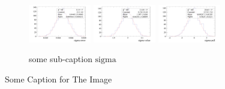 \begin{figure}
\begin{subfigure}[$\text{sigma}$]{\textwidth}
{\includegraphics[width=0.3\textwidth]{sigma_error_c_thru.png} }
{\includegraphics[width=0.3\textwidth]{sigma_value_c_thru.png} }
{\includegraphics[width=0.3\textwidth]{sigma_pull_c_thru.png} }
\caption{some sub-caption $\text{sigma}$}
\label{fig:sigma}
\end{subfigure}
\newline
\caption{Some Caption for The Image}
\label{fig:Some_Label}
\end{figure}


